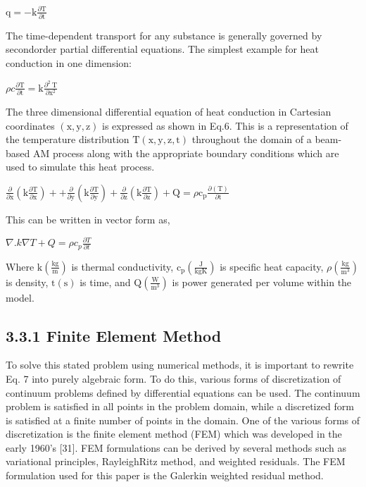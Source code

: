 \documentclass[10pt]{article}
\begin{document}
$\mathrm{q}=-\mathrm{k} \frac{\partial \mathrm{T}}{\partial \mathrm{t}}$

The time-dependent transport for any substance is generally governed by secondorder partial differential equations. The simplest example for heat conduction in one dimension:

$\rho c \frac{\partial \mathrm{T}}{\partial \mathrm{t}}=\mathrm{k} \frac{\partial^{2} \mathrm{~T}}{\partial \mathrm{x}^{2}}$

The three dimensional differential equation of heat conduction in Cartesian coordinates $(\mathrm{x}, \mathrm{y}, \mathrm{z})$ is expressed as shown in Eq.6. This is a representation of the temperature distribution $\mathrm{T}(\mathrm{x}, \mathrm{y}, \mathrm{z}, \mathrm{t})$ throughout the domain of a beam-based AM process along with the appropriate boundary conditions which are used to simulate this heat process.

$\frac{\partial}{\partial \mathrm{x}}\left(\mathrm{k} \frac{\partial \mathrm{T}}{\partial \mathrm{x}}\right)++\frac{\partial}{\partial \mathrm{y}}\left(\mathrm{k} \frac{\partial \mathrm{T}}{\partial \mathrm{y}}\right)+\frac{\partial}{\partial \mathrm{z}}\left(\mathrm{k} \frac{\partial \mathrm{T}}{\partial \mathrm{z}}\right)+\mathrm{Q}=\rho \mathrm{c}_{\mathrm{p}} \frac{\partial(\mathrm{T})}{\partial \mathrm{t}}$

This can be written in vector form as,

$\nabla . k \nabla T+Q=\rho c_{p} \frac{\partial T}{\partial t}$

Where $\mathrm{k}\left(\frac{\mathrm{kg}}{\mathrm{m}}\right)$ is thermal conductivity, $\mathrm{c}_{\mathrm{p}}\left(\frac{\mathrm{J}}{\mathrm{kgK}}\right)$ is specific heat capacity, $\rho\left(\frac{\mathrm{kg}}{\mathrm{m}^{3}}\right)$ is density, $\mathrm{t}(\mathrm{s})$ is time, and $\mathrm{Q}\left(\frac{\mathrm{W}}{\mathrm{m}^{3}}\right)$ is power generated per volume within the model.

\subsection*{3.3.1 Finite Element Method}
To solve this stated problem using numerical methods, it is important to rewrite Eq. 7 into purely algebraic form. To do this, various forms of discretization of continuum problems defined by differential equations can be used. The continuum problem is satisfied in all points in the problem domain, while a discretized form is satisfied at a finite number of points in the domain. One of the various forms of discretization is the finite element method (FEM) which was developed in the early 1960's [31]. FEM formulations can be derived by several methods such as variational principles, RayleighRitz method, and weighted residuals. The FEM formulation used for this paper is the Galerkin weighted residual method.
\end{document}
